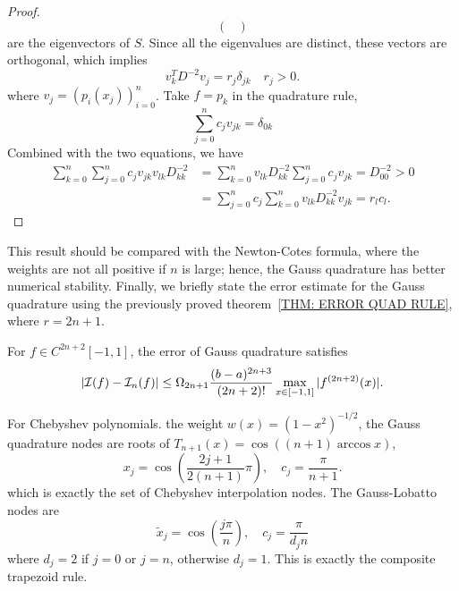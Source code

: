 \begin{proof}
\begin{equation}
\begin{pmatrix}
       \end{pmatrix}
   \end{equation}
   are the eigenvectors of $S$. Since all the eigenvalues are distinct, these vectors are orthogonal, which implies 
   \begin{equation}
       v_k^T  D^{-2} v_j = r_j \delta_{jk}\quad r_j > 0.
   \end{equation}
   where $v_{j} = (p_i(x_j))_{i=0}^n $. Take $f = p_k$ in the quadrature rule, 
   \begin{equation}
       \sum_{j = 0}^n c_j v_{jk} 
 = \delta_{0k}
   \end{equation}
   Combined with the two equations, we have 
   \begin{equation}
    \begin{aligned}
        \sum_{k=0}^{n}\sum_{j = 0}^n c_j v_{jk} v_{lk} D_{kk}^{-2} &=   \sum_{k=0}^{n} v_{lk} D_{kk}^{-2} \sum_{j = 0}^n c_j v_{jk} =  D_{00}^{-2} > 0 \\
        &=     \sum_{j = 0}^n c_j \sum_{k=0}^{n} v_{lk} D_{kk}^{-2}  v_{jk} = r_l  c_l.
    \end{aligned}
   \end{equation}
\end{proof}
This result should be compared with the Newton-Cotes formula, where the weights are not all positive if $n$ is large; hence, the Gauss quadrature has better numerical stability. 
Finally, we briefly state the error estimate for the Gauss quadrature using the previously proved theorem~\ref{THM: ERROR QUAD RULE}, where $r = 2n+1$.
\begin{corollary}
    For $f \in C^{2n+2}[-1,1]$, the error of Gauss quadrature satisfies 
    \begin{equation}
        |\mathcal I(f) -\mathcal I_n(f)| \le \Omega_{2n+1} \frac{(b-a)^{2n+3}}{(2n+2)!}\max_{x\in[-1,1]}|f^{(2n+2)}(x)|.
    \end{equation}
\end{corollary}
\begin{remark}
    For Chebyshev polynomials. the weight $w(x) = (1- x^2)^{-1/2}$, the Gauss quadrature nodes are roots of $T_{n+1}(x) = \cos((n+1)\arccos x)$,
$$x_j = \cos\left(\frac{2j+1}{2(n+1)}\pi\right), \quad c_j = \frac{\pi}{n+1}.$$ 
which is exactly the set of Chebyshev interpolation nodes. The Gauss-Lobatto nodes are 
$$\tilde{x}_j = \cos\left(   \frac{j \pi}{n}\right),\quad c_j = \frac{\pi}{d_jn}$$
where $d_j = 2$ if $j = 0$ or $j = n$, otherwise $d_j = 1$. This is exactly the composite trapezoid rule. 
\end{remark}


